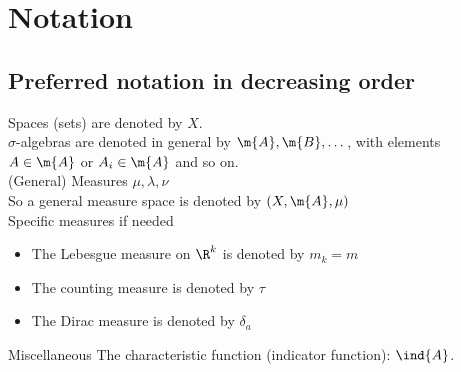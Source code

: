 \section{Notation}
\subsection{Preferred notation in decreasing order}

Spaces (sets) are denoted by $X$.\\

$\sigma$-algebras are denoted in general by
$\m{A}, \m{B}, \dots$, with elements $A\in \m{A}$ or $A_{i}\in \m{A}$ and so on.\\

(General) Measures
$\mu, \lambda, \nu$\\

So a general measure space is denoted by $(X, \m{A}, \mu)$\\

Specific measures if needed
\begin{itemize}
\item The Lebesgue measure on $\R^{k}$ is denoted by $m_{k}=m$
\item The counting measure is denoted by $\tau$
\item The Dirac measure is denoted by $\delta_{a}$\\
\end{itemize}


Miscellaneous
The characteristic function (indicator function):
$\ind{A}$.